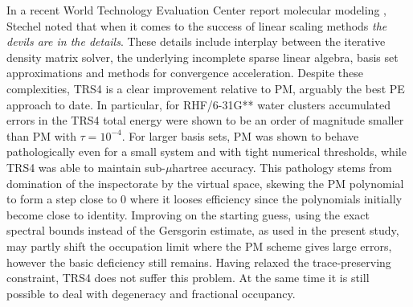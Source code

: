 \commentoutA{\documentclass[prb,aps,twocolumn,twocolumngrid,secnumarabic]{revtex4}}
\begin{document}
In a recent World Technology Evaluation Center report molecular modeling \cite{WTECMM02}, Stechel noted that 
when it comes to the success of linear scaling  methods {\em the devils are in the details}.
These details include interplay between the iterative density matrix solver, the underlying incomplete sparse 
linear algebra, basis set approximations and methods for convergence acceleration.   
Despite these complexities, TRS4 is a clear improvement relative to PM, arguably the best 
PE approach to date.  
In particular,  for RHF/6-31G** water clusters accumulated errors in the TRS4 total energy 
were shown to be an order of magnitude smaller than PM with $\tau=10^{-4}$.  
For larger basis sets, PM was shown to behave pathologically even 
for a small system and with tight numerical thresholds, while TRS4 was able to maintain
sub-$\mu$hartree accuracy.  This pathology stems from domination of the inspectorate
by the virtual space, skewing the PM polynomial to form a step close to $0$
where it looses efficiency since the polynomials initially become close
to identity. Improving on the starting guess, using the
exact spectral bounds instead of the Gersgorin estimate, as used in the present study, 
may partly shift the occupation limit where the PM scheme gives large errors, however the
basic deficiency still remains. Having relaxed the trace-preserving constraint, TRS4
does not suffer this problem.
At the same time it is still possible to deal with degeneracy and fractional occupancy.
\end{document}
